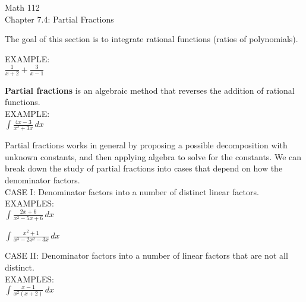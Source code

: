 \documentclass[11pt]{article}
\begin{document}
\begin{center}
\Large
\rm{Math 112}
\\
\rm{Chapter 7.4:  Partial Fractions}
\\
\end{center}
\vspace{0.2in}

The goal of this section is to integrate rational functions (ratios of polynomials).\\

\vspace{2in.}


EXAMPLE:\\

$\frac{1}{x+2} + \frac{3}{x-1}$

\vspace{2in.}

{\bf Partial fractions} is an algebraic method that reverses the addition of rational functions.\\

EXAMPLE:\\

$\int \frac{4x-3}{x^2+3x} \, dx$


\pagebreak

Partial fractions works in general by proposing a possible decomposition with unknown constants, and then applying algebra to
solve for the constants.  We can break down the study of partial fractions into cases that depend on how the denominator factors.\\

CASE I: Denominator factors into a number of distinct linear factors.\\

EXAMPLES:\\

$\int \frac{2x+6}{x^2-5x+6} \, dx$

\vspace{3in}

$\int \frac{x^2+1}{x^3-2x^2-3x} \, dx$

\vspace{2in}

\pagebreak

CASE II: Denominator factors into a number of linear factors that are not all distinct.\\

EXAMPLES:\\

$\int \frac{x-1}{x^2(x+2)} \, dx$

\vspace{4in}
\end{document}
